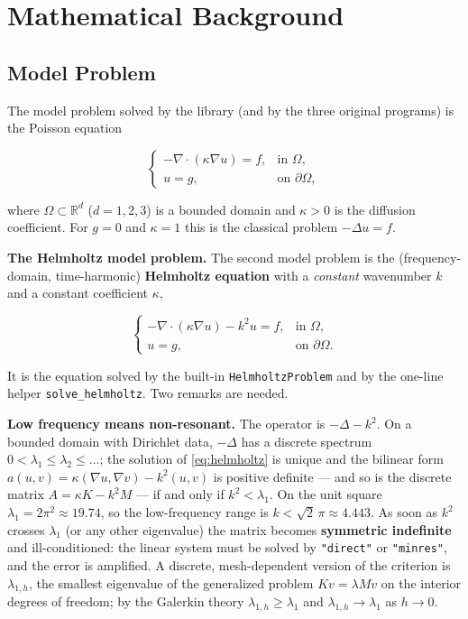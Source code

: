 \documentclass[11pt,oneside]{book}
\theoremstyle{definition}
\theoremstyle{plain}
\newenvironment{important}{%
  \begin{tcolorbox}[colback=blue!5,colframe=blue!45,title=Key Point,fonttitle=\bfseries]%
}{%
  \end{tcolorbox}%
}
\newcommand{\code}[1]{\texttt{#1}}
\begin{document}
\chapter{Mathematical Background}
\label{chap:math}

\section{Model Problem}

The model problem solved by the library (and by the three original programs) is the
Poisson equation

\begin{equation}
\begin{cases}
-\nabla\cdot(\kappa\nabla u) = f, & \text{in } \Omega,\\[2pt]
u = g, & \text{on } \partial\Omega,
\end{cases}
\label{eq:poisson}
\end{equation}

where $\Omega\subset\mathbb{R}^d$ ($d=1,2,3$) is a bounded domain and $\kappa>0$ is
the diffusion coefficient. For $g=0$ and $\kappa=1$ this is the classical problem
$-\Delta u=f$.

\textbf{The Helmholtz model problem.}\label{sec:helmholtz-model}
The second model problem is the (frequency-domain, time-harmonic) \textbf{Helmholtz
equation} with a \emph{constant} wavenumber $k$ and a constant coefficient
$\kappa$,

\begin{equation}
\begin{cases}
-\nabla\cdot(\kappa\nabla u)-k^2u=f, & \text{in } \Omega,\\[2pt]
u=g, & \text{on } \partial\Omega .
\end{cases}
\label{eq:helmholtz}
\end{equation}

It is the equation solved by the built-in \code{HelmholtzProblem} and by the
one-line helper \code{solve\_\allowbreak helmholtz}. Two remarks are needed.

\begin{important}
\textbf{Low frequency means non-resonant.} The operator is
$-\Delta-k^2$. On a bounded domain with Dirichlet data, $-\Delta$ has a discrete
spectrum $0<\lambda_1\le\lambda_2\le\dots$; the solution of \eqref{eq:helmholtz} is
unique and the bilinear form
$a(u,v)=\kappa(\nabla u,\nabla v)-k^2(u,v)$ is positive definite --- and so is the
discrete matrix $A=\kappa K-k^2M$ --- if and only if $k^2<\lambda_1$. On the unit
square $\lambda_1=2\pi^2\approx19.74$, so the low-frequency range is
$k<\sqrt2\,\pi\approx4.443$. As soon as $k^2$ crosses $\lambda_1$ (or any other
eigenvalue) the matrix becomes \textbf{symmetric indefinite} and ill-conditioned:
the linear system must be solved by \code{"direct"} or \code{"minres"}, and the
error is amplified. A discrete, mesh-dependent version of the criterion is
$\lambda_{1,h}$, the smallest eigenvalue of the generalized problem
$Kv=\lambda Mv$ on the interior degrees of freedom; by the Galerkin theory
$\lambda_{1,h}\ge\lambda_1$ and $\lambda_{1,h}\to\lambda_1$ as $h\to0$.
\end{important}
\end{document}
